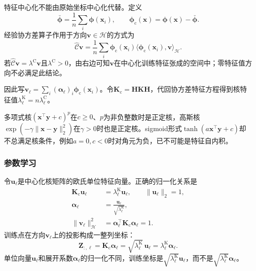 特征中心化不能由原始坐标中心化代替。定义
\[
  \bar{\bm{\phi}}=\frac1n\sum_i\bm{\phi}(\bm{x}_i),
  \qquad
  \bm{\phi}_{\mathrm{c}}(\bm{x})=\bm{\phi}(\bm{x})-\bar{\bm{\phi}}.
\]
经验协方差算子作用于方向$\bm{v}\in\mathcal{H}$的方式为
\begin{equation}
  \label{eq:dim-kpca-covariance}
  \widehat{\mathcal{C}}\bm{v}
  =\frac1n\sum_i
    \bm{\phi}_{\mathrm{c}}(\bm{x}_i)
    \langle\bm{\phi}_{\mathrm{c}}(\bm{x}_i),\bm{v}\rangle_{\mathcal{H}}.
\end{equation}
若$\widehat{\mathcal{C}}\bm{v}=\lambda^{\mathrm{C}}\bm{v}$且$\lambda^{\mathrm{C}}>0$，由右边可知$\bm{v}$在中心化训练特征张成的空间中；零特征值方向不必满足此结论。

因此写$\bm{v}_\ell=\sum_i(\bm{\alpha}_\ell)_i\bm{\phi}_{\mathrm{c}}(\bm{x}_i)$。令$\bm{K}_{\mathrm{c}}=\bm{H}\bm{K}\bm{H}$，代回协方差特征方程得到核特征值$\lambda_\ell^{\mathrm{K}}=n\lambda_\ell^{\mathrm{C}}$。

多项式核$(\bm{x}^{\top}\bm{y}+c)^p$在$c\geq0$、$p$为非负整数时是正定核，高斯核$\exp(-\gamma\lVert\bm{x}-\bm{y}\rVert_2^2)$在$\gamma>0$时也是正定核。sigmoid形式$\tanh(a\bm{x}^{\top}\bm{y}+c)$却不总满足核条件，例如$a=0,c<0$时对角元为负，已不可能是特征自内积。

\subsubsection{参数学习}

令$\bm{u}_\ell$是中心化核矩阵的欧氏单位特征向量。正确的归一化关系是
\begin{equation}
  \label{eq:dim-kpca-normalization}
  \begin{aligned}
    \bm{K}_{\mathrm{c}}\bm{u}_\ell
      &=\lambda_\ell^{\mathrm{K}}\bm{u}_\ell,
      \qquad\lVert\bm{u}_\ell\rVert_2=1,\\
    \bm{\alpha}_\ell
      &=\frac{\bm{u}_\ell}{\sqrt{\lambda_\ell^{\mathrm{K}}}},\\
    \lVert\bm{v}_\ell\rVert_{\mathcal{H}}^2
      &=\bm{\alpha}_\ell^{\top}\bm{K}_{\mathrm{c}}\bm{\alpha}_\ell=1.
  \end{aligned}
\end{equation}
训练点在方向$\bm{v}_\ell$上的投影构成一整列坐标：
\begin{equation}
  \label{eq:dim-kpca-training}
  \bm{Z}_{:,\ell}
  =\bm{K}_{\mathrm{c}}\bm{\alpha}_\ell
  =\sqrt{\lambda_\ell^{\mathrm{K}}}\,\bm{u}_\ell
  =\lambda_\ell^{\mathrm{K}}\bm{\alpha}_\ell.
\end{equation}
单位向量$\bm{u}_\ell$和展开系数$\bm{\alpha}_\ell$的归一化不同，训练坐标是$\sqrt{\lambda_\ell^{\mathrm{K}}}\bm{u}_\ell$，而不是$\sqrt{\lambda_\ell^{\mathrm{K}}}\bm{\alpha}_\ell$。

